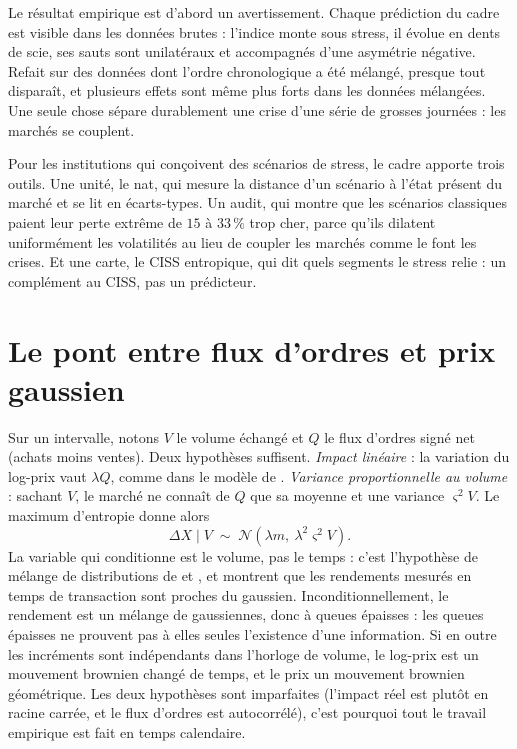 \documentclass[11pt]{article}
\theoremstyle{definition}
\begin{document}
Le résultat empirique est d'abord un avertissement. Chaque prédiction du cadre
est visible dans les données brutes : l'indice monte sous stress, il évolue en
dents de scie, ses sauts sont unilatéraux et accompagnés d'une asymétrie
négative. Refait sur des données dont l'ordre chronologique a été mélangé,
presque tout disparaît, et plusieurs effets sont même plus forts dans les
données mélangées. Une seule chose sépare durablement une crise d'une série de
grosses journées : les marchés se couplent.

Pour les institutions qui conçoivent des scénarios de stress, le cadre apporte
trois outils. Une unité, le nat, qui mesure la distance d'un scénario à l'état
présent du marché et se lit en écarts-types. Un audit, qui montre que les
scénarios classiques paient leur perte extrême de $15$ à $33\,\%$ trop cher,
parce qu'ils dilatent uniformément les volatilités au lieu de coupler les
marchés comme le font les crises. Et une carte, le CISS entropique, qui dit
quels segments le stress relie : un complément au CISS, pas un prédicteur.

\appendix

\section{Le pont entre flux d'ordres et prix gaussien}
\label{app:pont}

Sur un intervalle, notons $V$ le volume échangé et $Q$ le flux d'ordres signé
net (achats moins ventes). Deux hypothèses suffisent. \emph{Impact linéaire} :
la variation du log-prix vaut $\lambda Q$, comme dans le modèle de
\citet{kyle1985}. \emph{Variance proportionnelle au volume} : sachant $V$, le
marché ne connaît de $Q$ que sa moyenne et une variance $\varsigma^2V$. Le
maximum d'entropie donne alors
\begin{equation}
\Delta X \mid V \;\sim\; \mathcal N\!\left(\lambda m,\ \lambda^2\varsigma^2 V\right).
\end{equation}
La variable qui conditionne est le volume, pas le temps : c'est l'hypothèse de
mélange de distributions de \citet{clark1973} et \citet{tauchen1983}, et
\citet{ane2000} montrent que les rendements mesurés en temps de transaction sont
proches du gaussien. Inconditionnellement, le rendement est un mélange de
gaussiennes, donc à queues épaisses \citep{mandelbrot1967} : les queues épaisses
ne prouvent pas à elles seules l'existence d'une information. Si en outre les
incréments sont indépendants dans l'horloge de volume, le log-prix est un
mouvement brownien changé de temps, et le prix un mouvement brownien
géométrique. Les deux hypothèses sont imparfaites (l'impact réel est plutôt en
racine carrée, et le flux d'ordres est autocorrélé), c'est pourquoi tout le
travail empirique est fait en temps calendaire.
\end{document}
